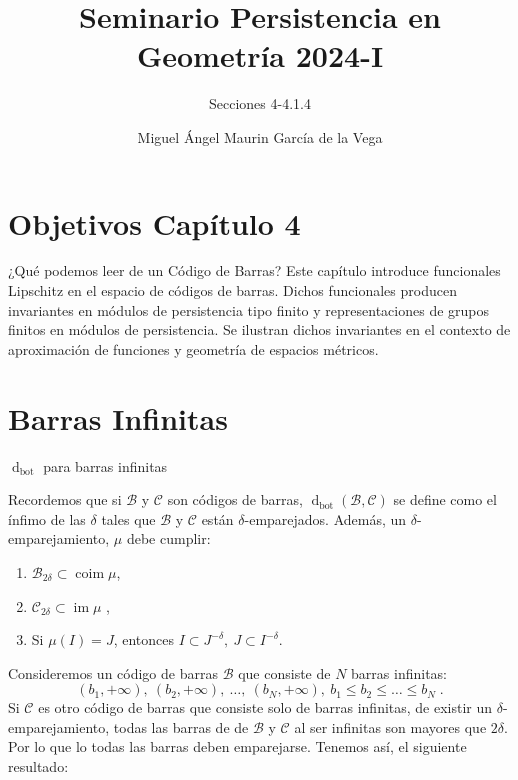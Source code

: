 \documentclass{beamer}
\title{Seminario Persistencia en Geometría 2024-I}
\subtitle{Secciones 4-4.1.4}
\author{Miguel Ángel Maurin García de la Vega}
\newcommand{\calB}{{\mathcal{B}}}
\newcommand{\calC}{{\mathcal{C}}}
\DeclareMathOperator{\coim}{coim}
\DeclareMathOperator{\im}{im}
\def\dbot{\operatorname{d}_{\operatorname{bot}}}
\begin{document}
\frenchspacing


  \frame{\maketitle}


    \section{Objetivos Capítulo 4}

    \begin{frame}{¿Qué podemos leer de un Código de Barras?}
Este capítulo introduce funcionales Lipschitz en el espacio de códigos de barras. \pause Dichos funcionales producen invariantes en módulos de persistencia tipo finito y representaciones de grupos finitos en módulos de persistencia. \pause Se ilustran dichos invariantes en el contexto de aproximación de funciones y geometría de espacios métricos. 

\end{frame}

\section{Barras Infinitas}
    
\begin{frame}{\(\dbot\) para barras infinitas}

Recordemos que si \(\mathcal{B}\) y \(\mathcal{C}\) son códigos de barras, \(\dbot(\mathcal{B},\mathcal{C})\) se define como el ínfimo de las \(\delta\) tales que \(\mathcal{B}\) y \(\mathcal{C}\) están \(\delta\)-emparejados.
\pause
Además, un $\delta$-emparejamiento, $\mu$ debe cumplir:
\pause
	\begin{enumerate}
		\item
			${\calB}_{2\delta} \subset \coim \mu$,\pause
		\item
			${\calC}_{2\delta} \subset \im \mu$ ,\pause
		\item
			Si $\mu (I) = J$, entonces $I \subset J^{-\delta},\ J \subset I^{-\delta}$.
	\end{enumerate}
Consideremos un código de barras \(\mathcal{B}\) que consiste de \(N\) barras infinitas: 
\pause
\[(b_1, +\infty),\ (b_2, +\infty),\ \ldots,\ (b_N, +\infty),\ b_1\leq b_2 \leq \ldots \leq b_N \;.\]
Si \(\mathcal{C}\) es otro código de barras que consiste solo de barras infinitas, \pause de existir un $\delta$-emparejamiento, todas las barras de de \(\calB\) y \(\calC\) al ser infinitas son mayores que $2\delta$. \pause Por lo que lo todas las barras deben emparejarse. Tenemos así, el siguiente resultado: 
\end{frame}
\end{document}
